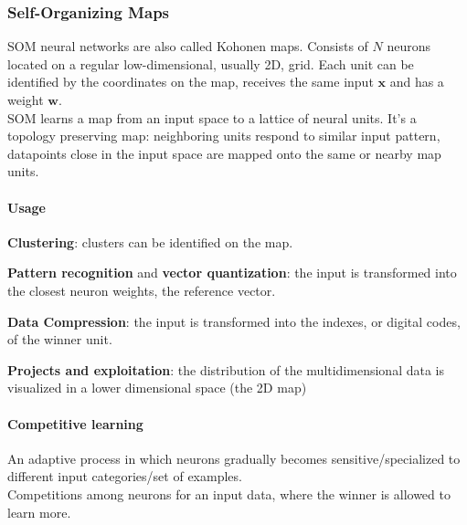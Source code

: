 \documentclass[10pt]{report}
\begin{document}
\subsubsection{Self-Organizing Maps} SOM neural networks are also called Kohonen maps. Consists of $N$ neurons located on a regular low-dimensional, usually 2D, grid. Each unit can be identified by the coordinates on the map, receives the same input $\mathbf{x}$ and has a weight $\mathbf{w}$.\\
SOM learns a map from an input space to a lattice of neural units. It's a topology preserving map: neighboring units respond to similar input pattern, datapoints close in the input space are mapped onto the same or nearby map units.
\paragraph{Usage} \begin{list}{}{}
	\item \textbf{Clustering}: clusters can be identified on the map.
	\item \textbf{Pattern recognition} and \textbf{vector quantization}: the input is transformed into the closest neuron weights, the reference vector.
	\item \textbf{Data Compression}: the input is transformed into the indexes, or digital codes, of the winner unit.
	\item \textbf{Projects and exploitation}: the distribution of the multidimensional data is visualized in a lower dimensional space (the 2D map)
\end{list}
\paragraph{Competitive learning} An adaptive process in which neurons gradually becomes sensitive/specialized to different input categories/set of examples.\\
Competitions among neurons for an input data, where the winner is allowed to learn more.
\end{document}
